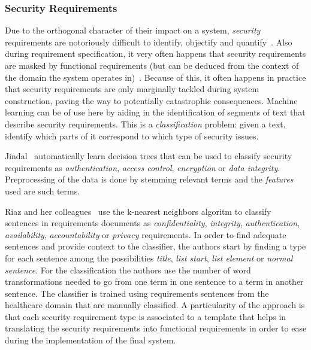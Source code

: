 \subsubsection{Security Requirements} 

Due to the orthogonal character of their impact on a system, \emph{security}
requirements are notoriously difficult to identify, objectify and
quantify~\cite{Rashid:2016}. Also during requirement specification, it very
often happens that security requirements are masked by functional requirements (but can be
deduced from the context of the domain the system operates in)~\cite{Riaz:2014}.
Because of this, it often happens in practice that security requirements are
only marginally tackled during system construction, paving the way
to potentially catastrophic consequences.
Machine learning can be of use here by aiding in the identification of segments
of text that describe security requirements. This is a \emph{classification}
problem: given a text, identify which parts of it correspond to which type of
security issues.

	Jindal\etal~\cite{Jildal:2016} automatically learn decision trees that can be
used to classify security requirements as \emph{authentication}, \emph{access
control}, \emph{encryption} or \emph{data integrity}. Preprocessing of the data
is done by stemming relevant terms and the \emph{features} used
are such terms.

	Riaz and her colleagues~\cite{Riaz:2014} use the k-nearest neighbors algoritm to
classify sentences in requirements documents as \emph{confidentiality},
\emph{integrity}, \emph{authentication}, \emph{availability},
\emph{accountability} or \emph{privacy} requirements. In order to find adequate
sentences and provide context to the classifier, the authors start by finding a
type for each sentence among the possibilities \emph{title}, \emph{list start},
\emph{list element} or \emph{normal sentence}. For the classification the
authors use the number of word transformations needed to go from one term in one sentence to a term in
another sentence. The classifier is trained using requirements sentences from
the healthcare domain that are manually classified. A particularity of the
approach is that each security requirement type is associated to a template that
helps in translating the security requirements into functional requirements in
order to ease during the implementation of the final system.

